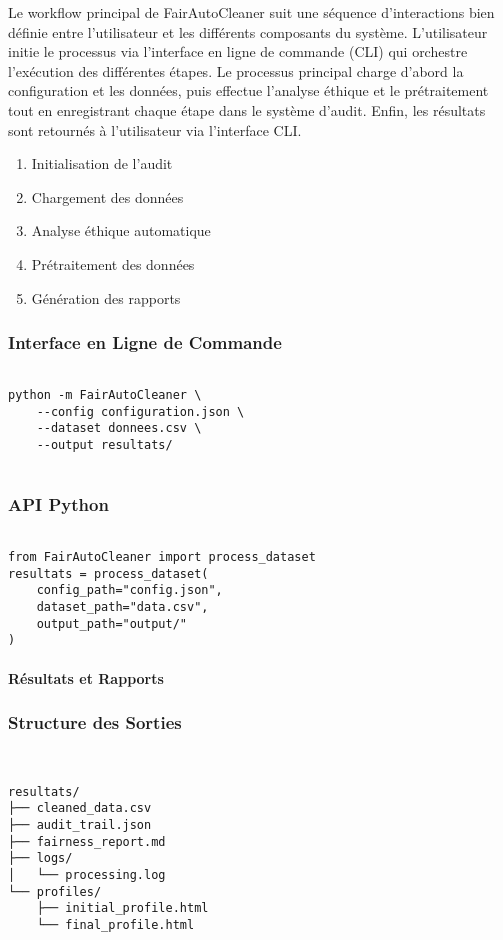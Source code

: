 Le workflow principal de FairAutoCleaner suit une séquence d'interactions bien définie entre l'utilisateur et les différents composants du système. L'utilisateur initie le processus via l'interface en ligne de commande (CLI) qui orchestre l'exécution des différentes étapes. Le processus principal charge d'abord la configuration et les données, puis effectue l'analyse éthique et le prétraitement tout en enregistrant chaque étape dans le système d'audit. Enfin, les résultats sont retournés à l'utilisateur via l'interface CLI.

\begin{enumerate}
    \item Initialisation de l'audit
    \item Chargement des données
    \item Analyse éthique automatique
    \item Prétraitement des données
    \item Génération des rapports
\end{enumerate}

\subsubsection{Interface en Ligne de Commande}
\begin{verbatim}

python -m FairAutoCleaner \
    --config configuration.json \
    --dataset donnees.csv \
    --output resultats/


\end{verbatim}

\subsubsection{API Python}
\begin{verbatim}

from FairAutoCleaner import process_dataset
resultats = process_dataset(
    config_path="config.json",
    dataset_path="data.csv", 
    output_path="output/"
)

\end{verbatim}

\paragraph*{Résultats et Rapports}

\subsubsection{Structure des Sorties}
\begin{verbatim}


resultats/
├── cleaned_data.csv
├── audit_trail.json
├── fairness_report.md
├── logs/
│   └── processing.log
└── profiles/
    ├── initial_profile.html
    └── final_profile.html

    
\end{verbatim}

